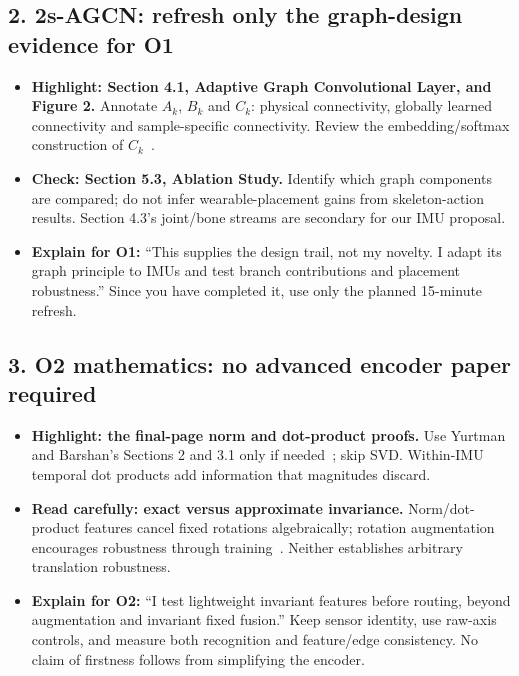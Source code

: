 \documentclass[10pt]{article}
\begin{document}
\subsection*{2. 2s-AGCN: refresh only the graph-design evidence for O1}
\begin{itemize}
\item \textbf{Highlight: Section 4.1, Adaptive Graph Convolutional Layer, and Figure 2.} Annotate $A_k$, $B_k$ and $C_k$: physical connectivity, globally learned connectivity and sample-specific connectivity. Review the embedding/softmax construction of $C_k$~\cite{omagcn}.
\item \textbf{Check: Section 5.3, Ablation Study.} Identify which graph components are compared; do not infer wearable-placement gains from skeleton-action results. Section 4.3's joint/bone streams are secondary for our IMU proposal.
\item \textbf{Explain for O1:} ``This supplies the design trail, not my novelty. I adapt its graph principle to IMUs and test branch contributions and placement robustness.'' Since you have completed it, use only the planned 15-minute refresh.
\end{itemize}

\subsection*{3. O2 mathematics: no advanced encoder paper required}
\begin{itemize}
\item \textbf{Highlight: the final-page norm and dot-product proofs.} Use Yurtman and Barshan's Sections 2 and 3.1 only if needed~\cite{omyurtman}; skip SVD. Within-IMU temporal dot products add information that magnitudes discard.
\item \textbf{Read carefully: exact versus approximate invariance.} Norm/dot-product features cancel fixed rotations algebraically; rotation augmentation encourages robustness through training~\cite{omum}. Neither establishes arbitrary translation robustness.
\item \textbf{Explain for O2:} ``I test lightweight invariant features before routing, beyond augmentation and invariant fixed fusion.'' Keep sensor identity, use raw-axis controls, and measure both recognition and feature/edge consistency. No claim of firstness follows from simplifying the encoder.
\end{itemize}
\end{document}
